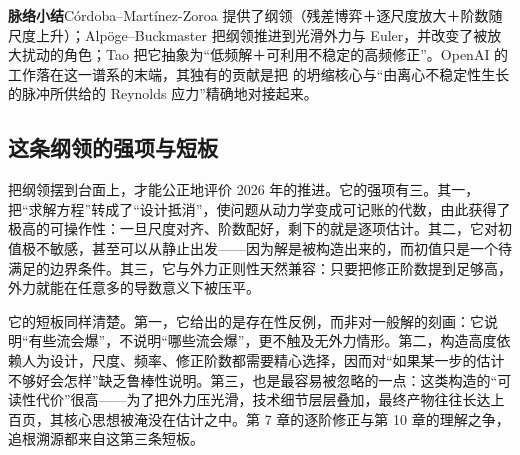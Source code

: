 \begin{principlebox}
\textbf{脉络小结}\quad Córdoba--Martínez-Zoroa 提供了纲领（残差博弈＋逐尺度放大＋阶数随尺度上升）；Alpöge--Buckmaster 把纲领推进到光滑外力与 Euler，并改变了被放大扰动的角色；Tao 把它抽象为“低频解＋可利用不稳定的高频修正”。OpenAI 的工作落在这一谱系的末端，其独有的贡献是把 \NS{} 的坍缩核心与“由离心不稳定性生长的脉冲所供给的 Reynolds 应力”精确地对接起来。
\end{principlebox}

\subsection{这条纲领的强项与短板}

把纲领摆到台面上，才能公正地评价 2026 年的推进。它的强项有三。其一，把“求解方程”转成了“设计抵消”，使问题从动力学变成可记账的代数，由此获得了极高的可操作性：一旦尺度对齐、阶数配好，剩下的就是逐项估计。其二，它对初值极不敏感，甚至可以从静止出发——因为解是被构造出来的，而初值只是一个待满足的边界条件。其三，它与外力正则性天然兼容：只要把修正阶数提到足够高，外力就能在任意多的导数意义下被压平。

它的短板同样清楚。第一，它给出的是存在性反例，而非对一般解的刻画：它说明“有些流会爆”，不说明“哪些流会爆”，更不触及无外力情形。第二，构造高度依赖人为设计，尺度、频率、修正阶数都需要精心选择，因而对“如果某一步的估计不够好会怎样”缺乏鲁棒性说明。第三，也是最容易被忽略的一点：这类构造的“可读性代价”很高——为了把外力压光滑，技术细节层层叠加，最终产物往往长达上百页，其核心思想被淹没在估计之中。第 7 章的逐阶修正与第 10 章的理解之争，追根溯源都来自这第三条短板。
